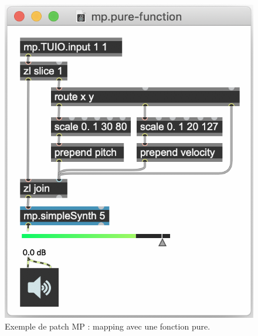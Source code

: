 \begin{figure}[!htbp]
	\captionsetup{format=plain}%
	\centering
	\begin{minipage}[t]{0.485\textwidth}
		\includegraphics[width=\linewidth]{gfx/04_algorithms/MP-mappingPure.png}
		\caption[Exemple de patch MP : fonction pure]{Exemple de patch MP : mapping avec une fonction pure.}
		\label{fig:algorithms:MP-pure}
	\end{minipage}
	\hspace{.01\linewidth}
	\begin{minipage}[t]{0.485\textwidth}

\end{minipage}
\end{figure}
